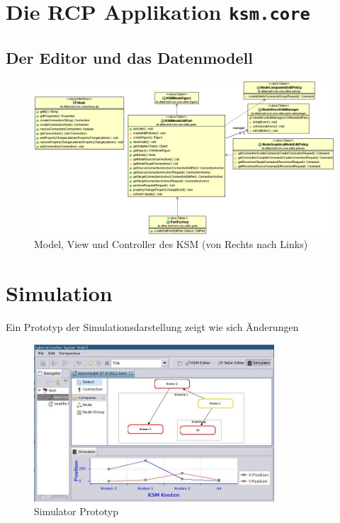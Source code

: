 \documentclass[%
12pt,titlepage,abstracton]{scrreprt}
\begin{document}
\section{Die RCP Applikation \texttt{ksm.\-core}}
\subsection{Der Editor und das Datenmodell}

\begin{figure}[mt]
\centering
\includegraphics[width=\textwidth]{images/node-edit-and-figure.PNG}
\caption{Model, View und Controller des KSM (von Rechts nach Links)}
\label{fig:node-edit-and-figure}
\end{figure}









\section{Simulation}
Ein Prototyp der Simulationsdarstellung zeigt wie sich Änderungen

\begin{figure}[ht!]
\centering
\includegraphics[width=0.8\textwidth]{images/eclipse-simulator.jpg}
\caption{Simulator Prototyp}
\label{fig:eclipse-simulator}
\end{figure}
\end{document}
